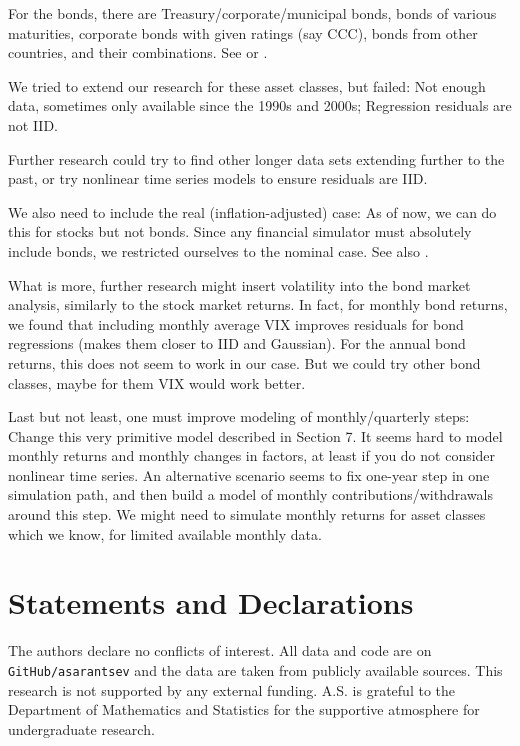 \documentclass[12pt]{amsart}
\begin{document}
For the bonds, there are Treasury/corporate/municipal bonds, bonds of various maturities, corporate bonds with given ratings (say CCC), bonds from other countries, and their combinations. See \cite[Chapter 10, Section 2]{Ilmanen} or \cite[Chapter 9]{Ang}. 

We tried to extend our research for these asset classes, but failed: Not enough data, sometimes only available since the 1990s and 2000s; Regression residuals are not IID. 

Further research could try to find other longer data sets extending further to the past, or try nonlinear time series models to ensure residuals are IID. 

We also need to include the real (inflation-adjusted) case: As of now, we can do this for stocks but not bonds. Since any financial simulator must absolutely include bonds, we restricted ourselves to the nominal case. See also \cite[Chapter 11]{Ang}. 

What is more, further research might insert volatility into the bond market analysis, similarly to the stock market returns. In fact, for monthly bond returns, we found that including monthly average VIX improves residuals for bond regressions (makes them closer to IID and Gaussian). For the annual bond returns, this does not seem to work in our case. But we could try other bond classes, maybe for them VIX would work better. 

Last but not least, one must improve modeling of monthly/quarterly steps: Change this very primitive model described in Section 7. It seems hard to model monthly returns and monthly changes in factors, at least if you do not consider nonlinear time series. An alternative scenario seems to fix one-year step in one simulation path, and then build a model of monthly contributions/withdrawals around this step. We might need to simulate monthly returns for asset classes which we know, for limited available monthly data. 

\section{Statements and Declarations}

The authors declare no conflicts of interest. All data and code are on \texttt{GitHub/asarantsev} and the data are taken from publicly available sources. This research is not supported by any external funding. A.S. is grateful to the Department of Mathematics and Statistics for the supportive atmosphere for undergraduate research.
\end{document}
